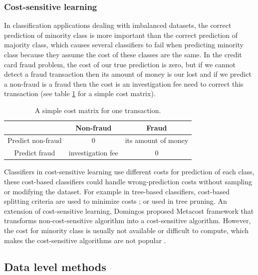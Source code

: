 \subsubsection*{Cost-sensitive learning}
\label{cost_sensitive_learning}

In classification applications dealing with imbalanced datasets, the correct prediction of minority class is more important than the correct prediction of majority class, which causes several classifiers to fail when predicting minority class because they assume the cost of these classes are the same. In the credit card fraud problem, the cost of our true prediction is zero, but if we cannot detect a fraud transaction then its amount of money is our lost and if we predict a non-fraud is a fraud then the cost is an investigation fee need to correct this transaction (see table \ref{tab:simple_cost_matrix} for a simple cost matrix).


\begin{table}[h!]
  \centering
  \caption{A simple cost matrix for one transaction.}
  \label{tab:simple_cost_matrix}
  \begin{tabular}{|c|c|c|}
      \hline
    &Non-fraud&Fraud \\
    \hline
    Predict non-fraud&0&its amount of money \\ \hline
    Predict fraud&investigation fee&0 \\ \hline
  \end{tabular}
\end{table}


Classifiers in cost-sensitive learning use different costs for prediction of each class, these cost-based classifiers could handle wrong-prediction costs without sampling or modifying the dataset. For example in tree-based classifiers, cost-based splitting criteria are used to minimize costs \citep{ling2004decision}; or used in tree pruning\citep{bradford1998pruning}. An extension of cost-sensitive learning, Domingos proposed Metacost \citep{domingos1999metacost} framework that transforms non-cost-sensitive algorithm into a cost-sensitive algorithm. However, the cost for minority class is usually not available or difficult to compute, which makes the cost-sensitive algorithms are not popular \citep{maloof1997learning}.


\subsection*{Data level methods}
\label{data_level_methods}

